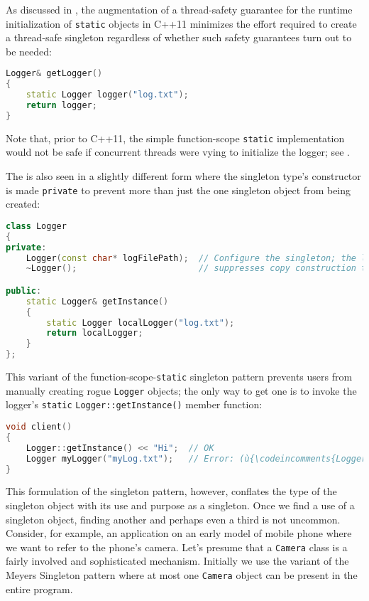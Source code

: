 As discussed in {}, the augmentation of a
thread-safety guarantee for the runtime initialization of
 \lstinline!static! objects in C++11 minimizes the
effort required to create a thread-safe singleton regardless of whether
such safety guarantees turn out to be needed:

\begin{lstlisting}[language=C++]
Logger& getLogger()
{
    static Logger logger("log.txt");
    return logger;
}
\end{lstlisting}
    
\noindent Note that, prior to C++11, the simple function-scope \lstinline!static!
implementation would not be safe if concurrent threads were vying to
initialize the logger; see {}.

The  is also seen in a slightly different form
where the singleton type's constructor is made \lstinline!private! to
prevent more than just the one singleton object from being created:


\begin{lstlisting}[language=C++]
class Logger
{
private:
    Logger(const char* logFilePath);  // Configure the singleton; the logger
    ~Logger();                        // suppresses copy construction too.

public:
    static Logger& getInstance()
    {
        static Logger localLogger("log.txt");
        return localLogger;
    }
};
\end{lstlisting}
    
\noindent This variant of the function-scope-\lstinline!static! singleton pattern
prevents users from manually creating rogue \lstinline!Logger! objects; the
only way to get one is to invoke the logger's \lstinline!static!
\lstinline!Logger::getInstance()! member function:

\begin{lstlisting}[language=C++]
void client()
{
    Logger::getInstance() << "Hi";  // OK
    Logger myLogger("myLog.txt");   // Error: (ù{\codeincomments{Logger::Logger(const char*)}}ù) is (ù{\codeincomments{private}}ù).
}
\end{lstlisting}
    
\noindent This formulation of the singleton pattern, however, conflates the type
of the singleton object with its use and purpose as a singleton. Once we
find a use of a singleton object, finding another and perhaps even a
third is not uncommon. Consider, for example, an application on an early
model of mobile phone where we want to refer to the phone's camera.
Let's presume that a \lstinline!Camera! class is a fairly involved and
sophisticated mechanism. Initially we use the variant of the Meyers
Singleton pattern where at most one \lstinline!Camera! object can be
present in the entire program.

